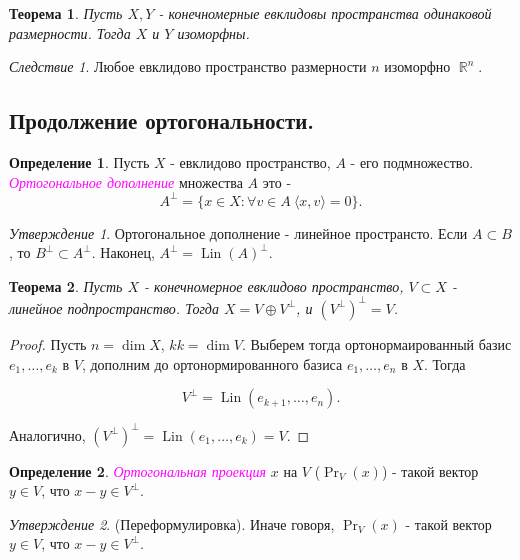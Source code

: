\documentclass[a4paper,100pt]{article}
\theoremstyle{indented}
\newtheorem{theorem}{Теорема}
\theoremstyle{definition}
\newtheorem{defn}{Определение}
\theoremstyle{remark}
\newtheorem{cons}{Следствие}
\newtheorem{stat}{Утверждение}
\DeclareMathOperator{\RR}{\mathbb{R}}
\DeclareMathOperator{\Lin}{Lin}
\DeclareMathOperator{\Prf}{Pr}
\begin{document}
\begin{theorem}
    Пусть $X, Y$ - конечномерные евклидовы пространства одинаковой размерности. Тогда $X$ и $Y$ изоморфны.
\end{theorem}

\begin{cons}
    Любое евклидово пространство размерности $n$ изоморфно $\RR^n$. 
\end{cons}

\subsection{Продолжение ортогональности.}

\begin{defn}
    Пусть $X$ - евклидово пространство, $A$ - его подмножество. \textit{\textcolor{magenta}{\hypertarget{s67}{Ортогональное дополнение}}} множества $A$ это - 
    \[
        A^{\perp}=\{x\in X: \forall v\in A \: \langle x, v \rangle = 0\}. 
    \]
\end{defn}

\begin{stat}
    Ортогональное дополнение - линейное пространсто. Если $A\subset B$, то $B^{\perp} \subset A^{\perp}$. Наконец, $A^{\perp} = \Lin(A)^{\perp}$. 
\end{stat}

\begin{theorem}
    Пусть $X$ - конечномерное евклидово пространство, $V\subset X$ - линейное подпространство. Тогда $X= V \oplus V^{\perp}$, и $(V^{\perp})^{\perp}=V$.
\end{theorem}

\begin{proof}
    Пусть $n = \dim X$, $kk = \dim V$. Выберем тогда ортонормаированный базис $e_1, \ldots, e_k$ в $V$, дополним до ортонормированного базиса $e_1, \ldots, e_n$ в $X$. Тогда 

    \[
        V^{\perp} = \Lin (e_{k+1}, \ldots, e_n). 
    \]

    Аналогично, $(V^{\perp})^{\perp} = \Lin(e_1, \ldots, e_k) = V$. 
\end{proof}

\begin{defn}
    \textit{\textcolor{magenta}{\hypertarget{s68}{Ортогональная проекция}}} $x$ на $V$ ($\Prf_V(x)$) - такой вектор $y\in V$, что $x-y\in V^{\perp}$. 
\end{defn}

\begin{stat}
    (Переформулировка). Иначе говоря, $\Pr_V(x)$ - такой вектор $y \in V$, что $x-y \in V^{\perp}$. 
\end{stat}
\end{document}
